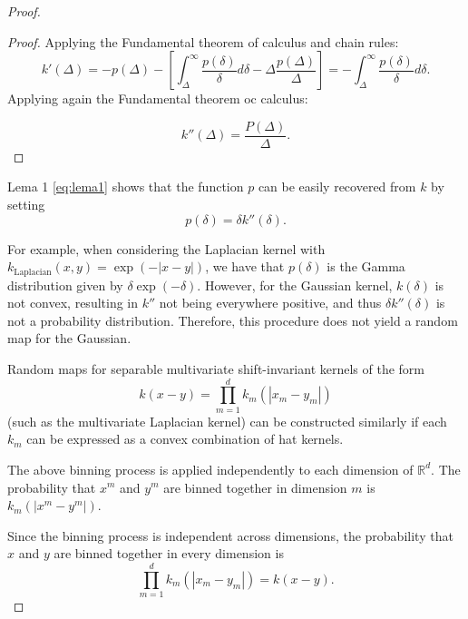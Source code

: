 \begin{proof}
\begin{proof}
Applying the Fundamental theorem of calculus and chain rules: 
\begin{equation}
   k'(\Delta)
   = 
   - p(\Delta)
   - 
   \left[
    \int_{\Delta}^\infty
            \frac{p(\delta)}{\delta}
            d \delta
    -
    \Delta \frac{p(\Delta)}{\Delta}
   \right] 
   = - \int_{\Delta}^\infty
   \frac{p(\delta)}{\delta}
   d \delta.
\end{equation}
Applying again the Fundamental theorem oc calculus: 

\begin{equation}
    k''(\Delta)
    = 
    \frac{P(\Delta)}{\Delta}. 
\end{equation}
\end{proof}


Lema 1 \ref{eq:lema1} shows that the function $p$ can be easily recovered from $k$ by setting 
\begin{equation}
    p(\delta) = \delta k''(\delta).   
\end{equation}

 For example, when considering the Laplacian kernel with $k_{\text{Laplacian}}(x, y) = \exp(-|x - y|)$, we have that $p(\delta)$ is the Gamma distribution given by $\delta \exp(-\delta)$. However, for the Gaussian kernel, $k(\delta)$ is not convex, resulting in $k''$ not being everywhere positive, and thus $\delta k''(\delta)$ is not a probability distribution. Therefore, this procedure does not yield a random map for the Gaussian.


 Random maps for separable multivariate shift-invariant kernels of the form 
 \begin{equation}
    k(x - y) = \prod_{m=1}^d k_m(|x_m - y_m|)
 \end{equation}
  (such as the multivariate Laplacian kernel) 
  can be constructed similarly if each $k_m$ can be expressed as a convex combination of hat kernels. 
  
  The above binning process is applied independently to each dimension of $\mathbb{R}^d$. The probability that $x^m$ and $y^m$ are binned together in dimension $m$ is $k_m(|x^m - y^m|)$. 
  
  Since the binning process is independent across dimensions, the probability that $x$ and $y$ are binned together in every dimension is 
  \begin{equation}
    \prod_{m=1}^d k_m(|x_m - y_m|) = k(x - y).
  \end{equation}
   

\end{proof}
